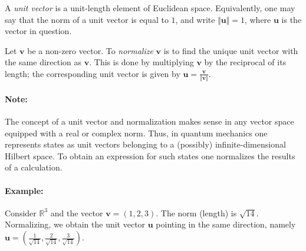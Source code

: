 \documentclass{article}
\newcommand{\bu}{\mathbf{u}}
\newcommand{\bv}{\mathbf{v}}
\begin{document}
A \emph{unit vector} is a unit-length element of Euclidean space.
Equivalently, one may say that the norm of a unit vector is equal
to $1$, and write $\Vert \bu\Vert=1$, where $\bu$ is the vector in
question.

Let $\bv$ be a non-zero vector.  To \emph{normalize} $\bv$ is to find
the unique unit vector with the same direction as $\bv$. This is done
by multiplying $\bv$ by the reciprocal of its length; the
corresponding unit vector is given by $\bu=\frac{\bv}{\Vert
  \bv\Vert}$.

\paragraph{Note:} The concept of a unit vector and normalization makes
sense in any vector space equipped with a real or complex norm.
Thus, in quantum mechanics one  represents states as unit vectors
belonging to a (possibly) infinite-dimensional Hilbert space.  To
obtain an expression for such states one  normalizes
the results of a calculation. 

\paragraph{Example:} Consider $\mathbb{R}^3$ and the vector
$\bv=(1,2,3)$. The norm (length) is $\sqrt{14}$.  Normalizing, we obtain
the unit vector $\bu$ pointing in the same direction, namely
$\bu=\left(\frac{1}{\sqrt{14}},\frac{2}{\sqrt{14}},\frac{3}{\sqrt{14}}\right)$.
\end{document}
